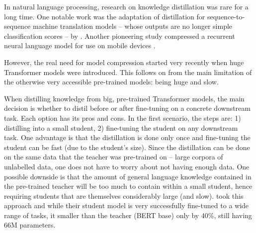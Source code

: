 \documentclass[bsc,frontabs,twoside,singlespacing,parskip,deptreport]{infthesis}
\begin{document}
{{{      %
      In natural language processing, research on knowledge distillation was rare for a long time. One notable work was the adaptation of distillation for sequence-to-sequence machine translation models -- whose outputs are no longer simple classification scores -- by \citet{Kim_2016}. Another pioneering study compressed a recurrent neural language model for use on mobile devices \citep{Yu_2018}.

      However, the real need for model compression started very recently when huge Transformer models were introduced. This follows on from the main limitation of the otherwise very accessible pre-trained models: being huge and slow.

      When distilling knowledge from big, pre-trained Transformer models, the main decision is whether to distil before or after fine-tuning on a concrete downstream task. Each option has its pros and cons.
      In the first scenario, the steps are: 1) distilling into a small student, 2) fine-tuning the student on any downstream task. One advantage is that the distillation is done only once and fine-tuning the student can be fast (due to the student's size). Since the distillation can be done on the same data that the teacher was pre-trained on -- large corpora of unlabelled data, one does not have to worry about not having enough data. One possible downside is that the amount of general language knowledge contained in the pre-trained teacher will be too much to contain within a small student, hence requiring students that are themselves considerably large (and slow). \citet{Sanh_2019} took this approach and while their student model is very successfully fine-tuned to a wide range of tasks, it smaller than the teacher (BERT base) only by 40\%, still having 66M parameters.

}}}
\end{document}
